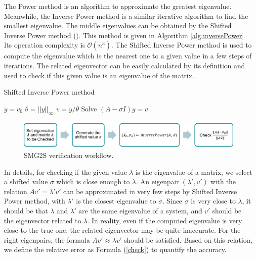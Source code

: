 The Power method is an algorithm to approximate the greatest eigenvalue. Meanwhile, the Inverse Power method is a similar iterative algorithm to find the smallest eigenvalue. The middle eigenvalues can be obtained by the Shifted Inverse Power method (\cite{hernandez2005single}).  This method is given in Algorithm \ref{alg:inversePower}. Its operation complexity is $\mathcal{O}(n^3)$. The Shifted Inverse Power method is used to compute the eigenvalue which is the nearest one to a given value in a few steps of iterations. The related eigenvector can be easily calculated by its definition and used to check if this given value is an eigenvalue of the matrix.

\begin{algorithm}[htbp]{}
	\caption{ Shifted Inverse Power method}   
	\label{alg:inversePower}   
	\begin{algorithmic}[1]
		\State $y=v_0$
		\State $\theta=||y||_\infty$
		\State $v=y/\theta$
		\State Solve $(A-\sigma I)y=v$
		\EndFor 
		\EndFunction
	\end{algorithmic}  
\end{algorithm}

\begin{figure}[htbp]
	\centering
	\includegraphics[width=6.2in]{fig/smg2s-check.pdf}
	\caption{SMG2S verification workflow.}
	\label{smg2s-check}
\end{figure}

In details, for checking if the given value $\lambda$ is the eigenvalue of a matrix, we select a shifted value $\sigma$ which is close enough to $\lambda$. An eigenpair $(\lambda', v')$ with the relation $Av'=\lambda' v'$ can be approximated in very few steps by Shifted Inverse Power method, with $\lambda'$ is the closest eigenvalue to $\sigma$. Since $\sigma$ is very close to $\lambda$, it should be that $\lambda$ and $\lambda'$ are the same eigenvalue of a system, and $v'$ should be the eigenvector related to $\lambda$. In reality, even if the computed eigenvalue is very close to the true one, the related eigenvector may be quite inaccurate. For the right eigenpairs, the formula $Av'\approx\lambda v'$ should be satisfied. Based on this relation, we define the relative error as Formula (\ref{check}) to quantify the accuracy. 

